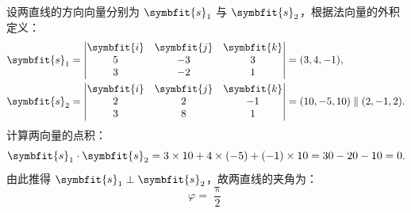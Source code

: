 \begin{solution}

    设两直线的方向向量分别为 $\symbfit{s}_1$ 与 $\symbfit{s}_2$，根据法向量的外积定义：
    \begin{equation*}
        \begin{aligned}
            \symbfit{s}_1 & = \begin{vmatrix} \symbfit{i} & \symbfit{j} & \symbfit{k} \\ 5 & -3 & 3 \\ 3 & -2 & 1 \end{vmatrix} = (3, 4, -1),                       \\
            \symbfit{s}_2 & = \begin{vmatrix} \symbfit{i} & \symbfit{j} & \symbfit{k} \\ 2 & 2 & -1 \\ 3 & 8 & 1 \end{vmatrix} = (10, -5, 10) \parallel (2, -1, 2).
        \end{aligned}
    \end{equation*}
    计算两向量的点积：
    \begin{equation*}
        \symbfit{s}_1 \cdot \symbfit{s}_2 = 3 \times 10 + 4 \times (-5) + (-1) \times 10 = 30 - 20 - 10 = 0.
    \end{equation*}
    由此推得 $\symbfit{s}_1 \perp \symbfit{s}_2$，故两直线的夹角为：
    \begin{equation*}
        \boxed{\varphi = \frac{\uppi}{2}}
    \end{equation*}



\end{solution}
